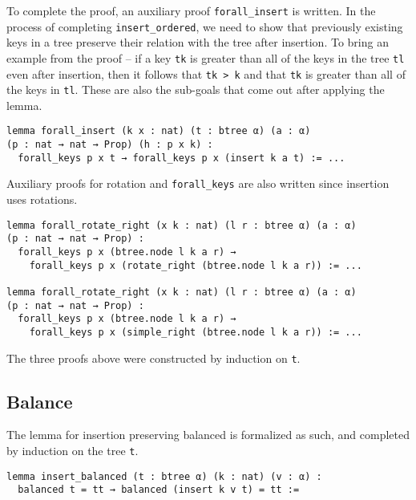To complete the proof, an auxiliary proof \lstinline{forall_insert} is written. In the process of completing \lstinline{insert_ordered}, we need to show that previously existing keys in a tree preserve their relation with the tree after insertion. To bring an example from the proof -- if a key \lstinline{tk} is greater than all of the keys in the tree \lstinline{tl} even after insertion, then it follows that \lstinline{tk > k} and that \lstinline{tk} is greater than all of the keys in \lstinline{tl}. These are also the sub-goals that come out after applying the lemma. 

\begin{lstlisting}
lemma forall_insert (k x : nat) (t : btree α) (a : α) 
(p : nat → nat → Prop) (h : p x k) :
  forall_keys p x t → forall_keys p x (insert k a t) := ...
\end{lstlisting}

Auxiliary proofs for rotation and \lstinline{forall_keys} are also written since insertion uses rotations.

\begin{lstlisting}
lemma forall_rotate_right (x k : nat) (l r : btree α) (a : α) 
(p : nat → nat → Prop) :
  forall_keys p x (btree.node l k a r) → 
    forall_keys p x (rotate_right (btree.node l k a r)) := ...

lemma forall_rotate_right (x k : nat) (l r : btree α) (a : α) 
(p : nat → nat → Prop) :
  forall_keys p x (btree.node l k a r) → 
    forall_keys p x (simple_right (btree.node l k a r)) := ...
\end{lstlisting}

The three proofs above were constructed by induction on \lstinline{t}.

\subsection*{Balance}
The lemma for insertion preserving balanced is formalized as such, and completed by induction on the tree \lstinline{t}.

\begin{lstlisting}
lemma insert_balanced (t : btree α) (k : nat) (v : α) :
  balanced t = tt → balanced (insert k v t) = tt :=
\end{lstlisting}

